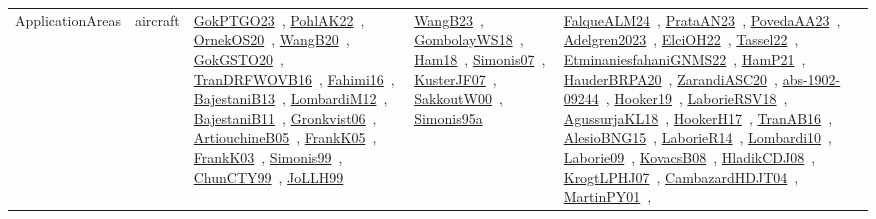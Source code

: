 {\begin{longtable}{lp{3cm}>{\raggedright\arraybackslash}p{6cm}>{\raggedright\arraybackslash}p{6cm}>{\raggedright\arraybackslash}p{8cm}}
\index{aircraft}\index{ApplicationAreas!aircraft}ApplicationAreas & aircraft & \href{../works/GokPTGO23.pdf}{GokPTGO23}~\cite{GokPTGO23}, \href{../works/PohlAK22.pdf}{PohlAK22}~\cite{PohlAK22}, \href{../works/OrnekOS20.pdf}{OrnekOS20}~\cite{OrnekOS20}, \href{../works/WangB20.pdf}{WangB20}~\cite{WangB20}, \href{../works/GokGSTO20.pdf}{GokGSTO20}~\cite{GokGSTO20}, \href{../works/TranDRFWOVB16.pdf}{TranDRFWOVB16}~\cite{TranDRFWOVB16}, \href{../works/Fahimi16.pdf}{Fahimi16}~\cite{Fahimi16}, \href{../works/BajestaniB13.pdf}{BajestaniB13}~\cite{BajestaniB13}, \href{../works/LombardiM12.pdf}{LombardiM12}~\cite{LombardiM12}, \href{../works/BajestaniB11.pdf}{BajestaniB11}~\cite{BajestaniB11}, \href{../works/Gronkvist06.pdf}{Gronkvist06}~\cite{Gronkvist06}, \href{../works/ArtiouchineB05.pdf}{ArtiouchineB05}~\cite{ArtiouchineB05}, \href{../works/FrankK05.pdf}{FrankK05}~\cite{FrankK05}, \href{../works/FrankK03.pdf}{FrankK03}~\cite{FrankK03}, \href{../works/Simonis99.pdf}{Simonis99}~\cite{Simonis99}, \href{../works/ChunCTY99.pdf}{ChunCTY99}~\cite{ChunCTY99}, \href{../works/JoLLH99.pdf}{JoLLH99}~\cite{JoLLH99} & \href{../works/WangB23.pdf}{WangB23}~\cite{WangB23}, \href{../works/GombolayWS18.pdf}{GombolayWS18}~\cite{GombolayWS18}, \href{../works/Ham18.pdf}{Ham18}~\cite{Ham18}, \href{../works/Simonis07.pdf}{Simonis07}~\cite{Simonis07}, \href{../works/KusterJF07.pdf}{KusterJF07}~\cite{KusterJF07}, \href{../works/SakkoutW00.pdf}{SakkoutW00}~\cite{SakkoutW00}, \href{../works/Simonis95a.pdf}{Simonis95a}~\cite{Simonis95a} & \href{../works/FalqueALM24.pdf}{FalqueALM24}~\cite{FalqueALM24}, \href{../works/PrataAN23.pdf}{PrataAN23}~\cite{PrataAN23}, \href{../works/PovedaAA23.pdf}{PovedaAA23}~\cite{PovedaAA23}, \href{../works/Adelgren2023.pdf}{Adelgren2023}~\cite{Adelgren2023}, \href{../works/ElciOH22.pdf}{ElciOH22}~\cite{ElciOH22}, \href{../works/Tassel22.pdf}{Tassel22}~\cite{Tassel22}, \href{../works/EtminaniesfahaniGNMS22.pdf}{EtminaniesfahaniGNMS22}~\cite{EtminaniesfahaniGNMS22}, \href{../works/HamP21.pdf}{HamP21}~\cite{HamP21}, \href{../works/HauderBRPA20.pdf}{HauderBRPA20}~\cite{HauderBRPA20}, \href{../works/ZarandiASC20.pdf}{ZarandiASC20}~\cite{ZarandiASC20}, \href{../works/abs-1902-09244.pdf}{abs-1902-09244}~\cite{abs-1902-09244}, \href{../works/Hooker19.pdf}{Hooker19}~\cite{Hooker19}, \href{../works/LaborieRSV18.pdf}{LaborieRSV18}~\cite{LaborieRSV18}, \href{../works/AgussurjaKL18.pdf}{AgussurjaKL18}~\cite{AgussurjaKL18}, \href{../works/HookerH17.pdf}{HookerH17}~\cite{HookerH17}, \href{../works/TranAB16.pdf}{TranAB16}~\cite{TranAB16}, \href{../works/AlesioBNG15.pdf}{AlesioBNG15}~\cite{AlesioBNG15}, \href{../works/LaborieR14.pdf}{LaborieR14}~\cite{LaborieR14}, \href{../works/Lombardi10.pdf}{Lombardi10}~\cite{Lombardi10}, \href{../works/Laborie09.pdf}{Laborie09}~\cite{Laborie09}, \href{../works/KovacsB08.pdf}{KovacsB08}~\cite{KovacsB08}, \href{../works/HladikCDJ08.pdf}{HladikCDJ08}~\cite{HladikCDJ08}, \href{../works/KrogtLPHJ07.pdf}{KrogtLPHJ07}~\cite{KrogtLPHJ07}, \href{../works/CambazardHDJT04.pdf}{CambazardHDJT04}~\cite{CambazardHDJT04}, \href{../works/MartinPY01.pdf}{MartinPY01}~\cite{MartinPY01}, 
\end{longtable}}
